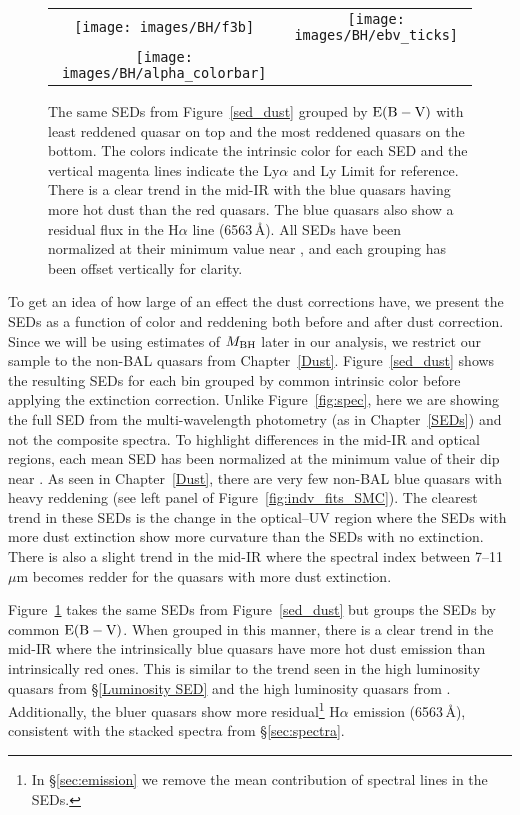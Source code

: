 \begin{figure}[t]
\begin{center}
\begin{tabular}{cc}
	\texttt{[image: images/BH/f3b]} & \texttt{[image: images/BH/ebv\_ticks]}\\
	\hspace{.4cm} \texttt{[image: images/BH/alpha\_colorbar]} &
\end{tabular}
\caption[Mean SEDs grouped by dust]{\label{sed_color} The same SEDs from Figure~\ref{sed_dust} grouped by ${\rm E(B-V)}$ with least reddened quasar on top and the most reddened quasars on the bottom. The colors indicate the intrinsic color for each SED and the vertical magenta lines indicate the Ly$\alpha$ and Ly Limit for reference. There is a clear trend in the mid-IR with the blue quasars having more hot dust than the red quasars.  The blue quasars also show a residual flux in the H$\alpha$ line (6563\,\AA).  All SEDs have been normalized at their minimum value near \onemum, and each grouping has been offset vertically for clarity.}
\end{center}
\end{figure}

To get an idea of how large of an effect the dust corrections have, we present the SEDs as a function of color and reddening both before and after dust correction.  Since we will be using estimates of $M_{\rm BH}$ later in our analysis, we restrict our sample to the non-BAL quasars from Chapter~\ref{Dust}.
Figure~\ref{sed_dust} shows the resulting SEDs for each bin grouped by common intrinsic color before applying the extinction correction. Unlike Figure~\ref{fig:spec}, here we are showing the full SED from the multi-wavelength photometry (as in Chapter~\ref{SEDs}) and not the composite spectra. To highlight differences in the mid-IR and optical regions, each mean SED has been normalized at the minimum value of their dip near \onemum.  As seen in Chapter~\ref{Dust}, there are very few non-BAL blue quasars with heavy reddening (see left panel of Figure~\ref{fig:indv_fits_SMC}). The clearest trend in these SEDs is the change in the optical--UV region where the SEDs with more dust extinction show more curvature than the SEDs with no extinction.  There is also a slight trend in the mid-IR where the spectral index between 7--11\,$\mu$m becomes redder for the quasars with more dust extinction.

Figure~\ref{sed_color} takes the same SEDs from Figure~\ref{sed_dust} but groups the SEDs by common ${\rm E(B-V)}$. When grouped in this manner, there is a clear trend in the mid-IR where the intrinsically blue quasars have more hot dust emission than intrinsically red ones.  This is similar to the trend seen in the high luminosity quasars from \S\ref{Luminosity SED} and the high luminosity quasars from \citet{Gallagher:2007a}. Additionally, the bluer quasars show more residual\footnote{In \S\ref{sec:emission} we remove the mean contribution of spectral lines in the SEDs.} H$\alpha$ emission (6563\,\AA), consistent with the stacked spectra from \S\ref{sec:spectra}.

